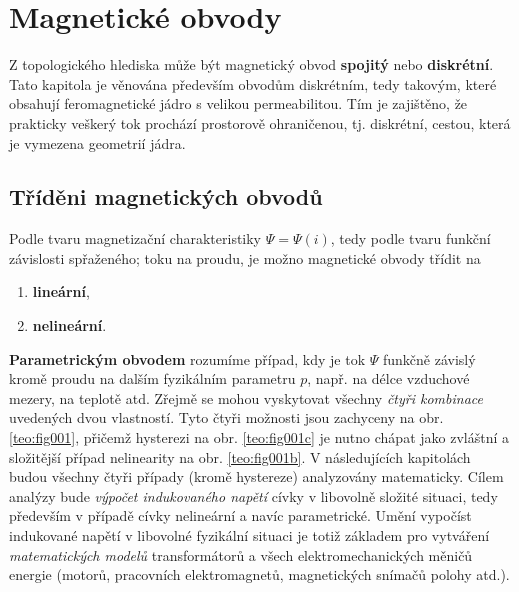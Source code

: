 {
\chapter{Magnetické obvody}\label{teo:IchapV}
\minitoc
  
  Z topologického hlediska může být magnetický obvod \textbf{spojitý} nebo \textbf{diskrétní}. Tato 
  kapitola je věnována především obvodům diskrétním, tedy takovým, které obsahují feromagnetické 
  jádro s velikou permeabilitou. Tím je zajištěno, že prakticky veškerý tok prochází prostorově 
  ohraničenou, tj. diskrétní, cestou, která je vymezena geometrií jádra.
  
  \section{Tříděni magnetických obvodů}\label{teo:IchapVsecI}
    Podle tvaru magnetizační charakteristiky \(\Psi=\Psi(i)\), tedy podle tvaru funkční závislosti 
    spřaženého; toku na proudu, je možno magnetické obvody třídit na
    \begin{enumerate}\addtolength{\itemsep}{-0.5\baselineskip}
      \item \textbf{lineární},
      \item \textbf{nelineární}.
    \end{enumerate}
    
    \textbf{Parametrickým obvodem} rozumíme případ, kdy je tok \(\Psi\) funkčně závislý kromě 
    proudu na dalším fyzikálním parametru \(p\), např. na délce vzduchové mezery, na teplotě atd. 
    Zřejmě se mohou vyskytovat všechny \emph{čtyři kombinace} uvedených dvou vlastností. Tyto čtyři 
    možnosti jsou zachyceny na obr. \ref{teo:fig001}, přičemž hysterezi na obr. \ref{teo:fig001c} 
    je nutno chápat jako zvláštní a složitější případ nelinearity na obr. \ref{teo:fig001b}. V 
    následujících kapitolách budou všechny čtyři případy (kromě hystereze) analyzovány matematicky. 
    Cílem analýzy bude \emph{výpočet indukovaného napětí} cívky v libovolně složité situaci, tedy 
    především v případě cívky nelineární a navíc parametrické. Umění vypočíst indukované napětí v 
    libovolné fyzikální situaci je totiž základem pro vytváření \emph{matematických modelů} 
    transformátorů a všech elektromechanických měničů energie (motorů, pracovních elektromagnetů, 
    magnetických snímačů polohy atd.).
 
}
